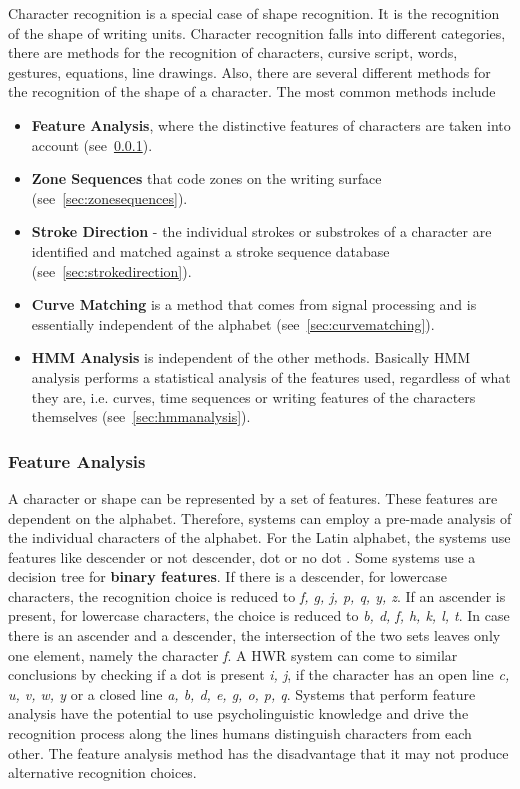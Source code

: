 Character recognition is a special case of shape recognition. It is the 
recognition of the shape of writing units. Character recognition falls into
different categories, there are methods for the recognition of characters,
cursive script, words, gestures, equations, line drawings. Also, there are 
several different methods for the recognition of the shape of a character.
The most common methods include 
\begin{itemize}
  \item \textbf{Feature Analysis}, where the distinctive features of characters 
    are taken into account (see~\ref{sec:featureanalysis}).
  \item \textbf{Zone Sequences} that code zones on the writing surface
    (see~\ref{sec:zonesequences}).
  \item \textbf{Stroke Direction} - the individual strokes or substrokes of a
    character are identified and matched against a stroke sequence database
    (see~\ref{sec:strokedirection}).
  \item \textbf{Curve Matching} is a method that comes from signal processing
    and is essentially independent of the alphabet (see~\ref{sec:curvematching}).
  \item \textbf{HMM Analysis} is independent of the other methods. Basically HMM
    analysis performs a statistical analysis of the features used, 
    regardless of what they are, i.e. curves, time sequences or writing features
    of the characters themselves (see~\ref{sec:hmmanalysis}).
\end{itemize}

\subsubsection{Feature Analysis}
\label{sec:featureanalysis}
A character or shape can be represented by a set of features. These features are
dependent on the alphabet. Therefore, systems can employ a pre-made analysis of 
the individual characters of the alphabet. For the Latin alphabet, the systems 
use features like descender or not descender, dot or no dot 
. Some systems use a decision tree for 
\textbf{binary features}. 
If there is a descender, for lowercase characters, the recognition choice is 
reduced to \emph{f, g, j, p, q, y, z}. If an ascender is present, for lowercase 
characters, the choice is reduced to \emph{b, d, f, h, k, l, t}. In case there
is an ascender and a descender, the intersection of the two sets leaves only 
one element, namely the character \emph{f}. A HWR system can come to similar 
conclusions by checking if a dot is present \emph{i, j}, if the character has an 
open line \emph{c, u, v, w, y} or a closed line \emph{a, b, d, e, g, o, p, q}. 
Systems that perform feature analysis have the potential to use psycholinguistic 
knowledge and drive the recognition process along the lines humans distinguish 
characters from each other. The feature analysis method has the disadvantage that
it may not produce alternative recognition choices.


